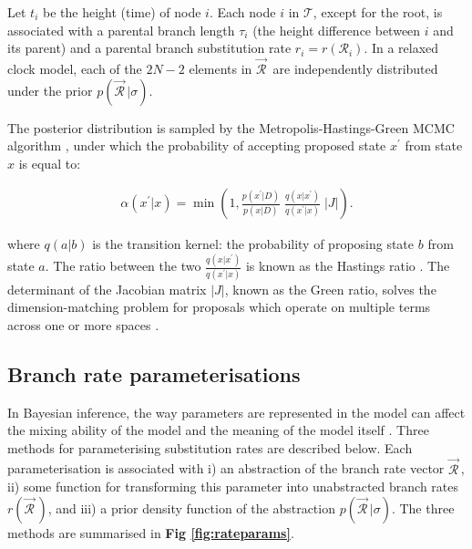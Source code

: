 \documentclass[10pt,letterpaper]{article}
\begin{document}
Let $t_i$ be the height (time) of node $i$.
Each node $i$ in $\mathcal{T}$, except for the root, is associated with a parental branch length $\tau_i$ (the height difference between $i$ and its parent)  and a parental branch substitution rate $r_i = r(\mathcal{R}_i)$. 
In a relaxed clock model, each of the $2N-2$ elements in $\vec{\mathcal{R}}^{\,}$ are independently distributed under the prior $p(\vec{\mathcal{R}}^{\,} | \sigma)$.



The posterior distribution is sampled by the Metropolis-Hastings-Green MCMC algorithm \cite{metropolis53, hastings70, green1995reversible},
under which the probability of accepting proposed state $x^\prime$ from state $x$ is equal to:

\begin{eqnarray}
\label{eq:MCMC}
\alpha(x^\prime|x) =  \min\left( 1, \frac{p(x^\prime|D)}{p(x|D)} \; \frac{q(x|x^\prime)}{q(x^\prime|x)} \; |J| \right).
\end{eqnarray}

\noindent
where $q(a|b)$ is the transition kernel: the probability of proposing state $b$ from state $a$.
The ratio between the two $\frac{q(x|x^\prime)}{q(x^\prime|x)}$ is known as the Hastings ratio \cite{hastings70}.
The determinant of the Jacobian matrix $|J|$, known as the Green ratio, solves the dimension-matching problem for proposals which operate on multiple terms across one or more spaces \cite{green1995reversible, geyer2003metropolis}. 




\clearpage
\subsection*{Branch rate parameterisations}
\label{sect:rateparams}

In Bayesian inference, the way parameters are represented in the model can affect the mixing ability of the model and the meaning of the model itself \cite{gelman2004parameterization}. Three methods for parameterising substitution rates are described below.
 Each parameterisation is associated with i) an abstraction of the branch rate vector $\vec{\mathcal{R}}^{\,}$, ii) some function for transforming this parameter into unabstracted branch rates $r(\vec{\mathcal{R}}^{\,})$, and iii) a prior density function of the abstraction $p(\vec{\mathcal{R}}^{\,} | \sigma) $. 
 The three methods are summarised in \textbf{Fig \ref{fig:rateparams}}.
\end{document}
